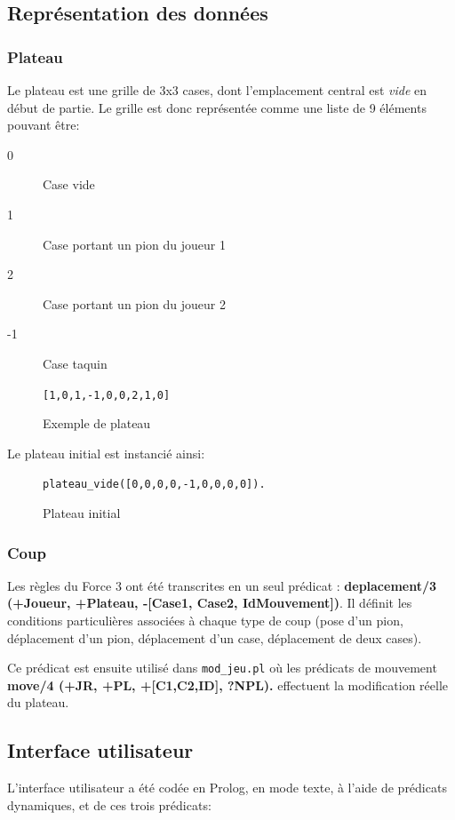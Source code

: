 \documentclass[a4paper,12pt]{article}
\newcommand{\code}[1]{\texttt{#1}}
\begin{document}
\subsection{Représentation des données}
\subsubsection{Plateau}
Le plateau est une grille de 3x3 cases, dont l'emplacement central est \emph{vide} en début de partie.
Le grille est donc représentée comme une liste de 9 éléments pouvant être:
  \begin{description}
    \item[0]  Case vide
    \item[1]  Case portant un pion du joueur 1
    \item[2]  Case portant un pion du joueur 2
    \item[-1] Case taquin
  \end{description}
  
  \begin{figure}[h]
    \code{[1,0,1,-1,0,0,2,1,0]}
    \centering
    \caption{Exemple de plateau}
  \end{figure}
  
Le plateau initial est instancié ainsi:\\
  \begin{figure}[h]
\code{plateau\_vide([0,0,0,0,-1,0,0,0,0]).}
    \centering
    \caption{Plateau initial}
  \end{figure}

\subsubsection{Coup}
Les règles du Force 3 ont été transcrites en un seul prédicat : \textbf{deplacement/3 (+Joueur, +Plateau, -[Case1, Case2, IdMouvement])}. Il définit les conditions particulières associées à chaque type de coup (pose d'un pion, déplacement d'un pion, déplacement d'un case, déplacement de deux cases).

Ce prédicat est ensuite utilisé dans \texttt{mod\_jeu.pl} où les prédicats de mouvement \textbf{move/4 (+JR, +PL, +[C1,C2,ID], ?NPL).} effectuent la modification réelle du plateau.

\subsection{Interface utilisateur}
    L'interface utilisateur a été codée en Prolog, en mode texte, à l'aide de prédicats dynamiques, et de
    ces trois prédicats:
\end{document}
